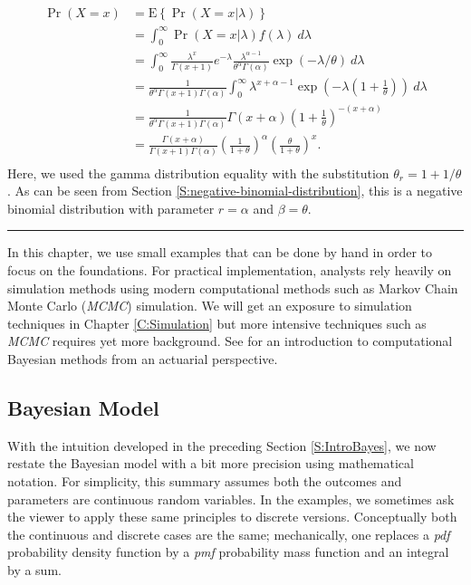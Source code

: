 \documentclass[]{book}
\theoremstyle{definition}
\theoremstyle{definition}
\theoremstyle{definition}
\theoremstyle{remark}
\begin{document}
\[
\begin{aligned}
\Pr(X = x) 
&=  \mathrm{E} \left\{\Pr(X = x|\lambda)\right\}\\
&=  \int_0^{\infty} \Pr(X = x|\lambda) f(\lambda) ~d\lambda \\
&=  \int_0^{\infty} \frac{\lambda^x}{\Gamma(x+1)} e^{-\lambda} \frac{\lambda^{\alpha-1}}{\theta^{\alpha}\Gamma(\alpha)}\exp(-\lambda/\theta) ~d\lambda\\
&=  \frac{1}{\theta^{\alpha}\Gamma(x+1)\Gamma(\alpha)} \int_0^{\infty} \lambda^{x+\alpha-1} \exp\left(-\lambda(1+\frac{1}{\theta})\right) ~d\lambda \\
&=  \frac{1}{\theta^{\alpha}\Gamma(x+1)\Gamma(\alpha)} \Gamma(x+\alpha)\left(1+\frac{1}{\theta}\right)^{-(x+\alpha)} \\
&=  \frac{\Gamma(x+\alpha)}{\Gamma(x+1)\Gamma(\alpha)}\left(\frac{1}{1+\theta}\right)^{\alpha} \left(\frac{\theta}{1+\theta}\right)^{x} .\\
\end{aligned} 
\] Here, we used the gamma distribution equality with the substitution
\(\theta_r = 1 + 1/\theta\). As can be seen from Section
\ref{S:negative-binomial-distribution}, this is a negative binomial
distribution with parameter \(r = \alpha\) and \(\beta = \theta\).

\begin{center}\rule{0.5\linewidth}{\linethickness}\end{center}

In this chapter, we use small examples that can be done by hand in order
to focus on the foundations. For practical implementation, analysts rely
heavily on simulation methods using modern computational methods such as
Markov Chain Monte Carlo (\emph{MCMC}) simulation. We will get an
exposure to simulation techniques in Chapter \ref{C:Simulation} but more
intensive techniques such as \emph{MCMC} requires yet more background.
See \citet{hartman2016} for an introduction to computational Bayesian
methods from an actuarial perspective.

\subsection{Bayesian Model}\label{bayesian-model}

With the intuition developed in the preceding Section
\ref{S:IntroBayes}, we now restate the Bayesian model with a bit more
precision using mathematical notation. For simplicity, this summary
assumes both the outcomes and parameters are continuous random
variables. In the examples, we sometimes ask the viewer to apply these
same principles to discrete versions. Conceptually both the continuous
and discrete cases are the same; mechanically, one replaces a
\emph{pdf}{ probability density function} by a \emph{pmf}{ probability
mass function} and an integral by a sum.
\end{document}
